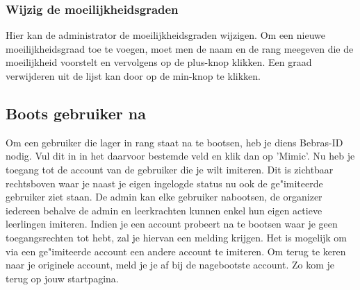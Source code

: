 \documentclass[]{article}
\begin{document}
\subsubsection{Wijzig de moeilijkheidsgraden}
Hier kan de administrator de moeilijkheidsgraden wijzigen. Om een nieuwe moeilijkheidsgraad toe te voegen, moet men de naam en de rang meegeven die de moeilijkheid voorstelt en vervolgens op de plus-knop klikken. Een graad verwijderen uit de lijst kan door op de min-knop te klikken.

\subsection{Boots gebruiker na}
Om een gebruiker die lager in rang staat na te bootsen, heb je diens Bebras-ID nodig. Vul dit in in het daarvoor bestemde veld en klik dan op 'Mimic'. Nu heb je toegang tot de account van de gebruiker die je wilt imiteren. Dit is zichtbaar rechtsboven waar je naast je eigen ingelogde status nu ook de ge"imiteerde gebruiker ziet staan. De admin kan elke gebruiker nabootsen, de organizer iedereen behalve de admin en leerkrachten kunnen enkel hun eigen actieve leerlingen imiteren. Indien je een account probeert na te bootsen waar je geen toegangsrechten tot hebt, zal je hiervan een melding krijgen. Het is mogelijk om via een ge"imiteerde account een andere account te imiteren. Om terug te keren naar je originele account, meld je je af bij de nagebootste account. Zo kom je terug op jouw startpagina. 
\end{document}
